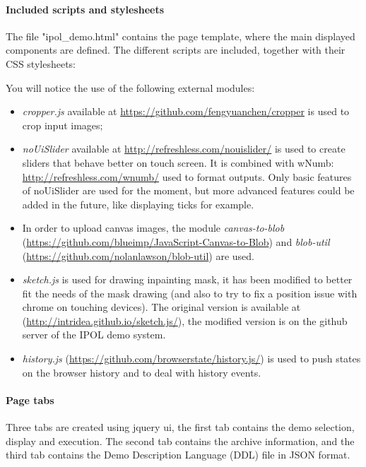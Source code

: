 \paragraph{Included scripts and stylesheets}
The file "ipol\_demo.html" contains the page template, where the main displayed components are defined.
The different scripts are included, together with their CSS stylesheets:



You will notice the use of the following external modules:
\begin{itemize}
 \item \emph{cropper.js} available at 
        \url{https://github.com/fengyuanchen/cropper} is used to crop input 
        images; 
 \item \emph{noUiSlider} available at 
        \url{http://refreshless.com/nouislider/} is used to create sliders that
        behave better on touch screen. It is combined with wNumb: 
        \url{http://refreshless.com/wnumb/} used to format outputs.
        Only basic features of noUiSlider are used for the moment, but more 
        advanced features could be added in the future, like displaying ticks 
        for example.
  \item In order to upload canvas images, the module 
        \emph{canvas-to-blob} 
        (\url{https://github.com/blueimp/JavaScript-Canvas-to-Blob}) and 
        \emph{blob-util} (\url{https://github.com/nolanlawson/blob-util}) are 
        used.
  \item \emph{sketch.js} is used for drawing inpainting mask, it has been 
        modified to better fit the needs of the mask drawing (and also to try 
        to fix a position issue with chrome on touching devices). The original   
        version is available at (\url{http://intridea.github.io/sketch.js/}), 
        the modified version is on the github server of the IPOL demo system.
  \item \emph{history.js} (\url{https://github.com/browserstate/history.js/}) is 
        used to push states on the browser history and to deal with  
        history events.
\end{itemize}

\paragraph{Page tabs} Three tabs are created using jquery ui, the first tab
contains the demo selection, display and execution. The second tab contains
the archive information, and the third tab contains the Demo Description 
Language (DDL) file in JSON format.

